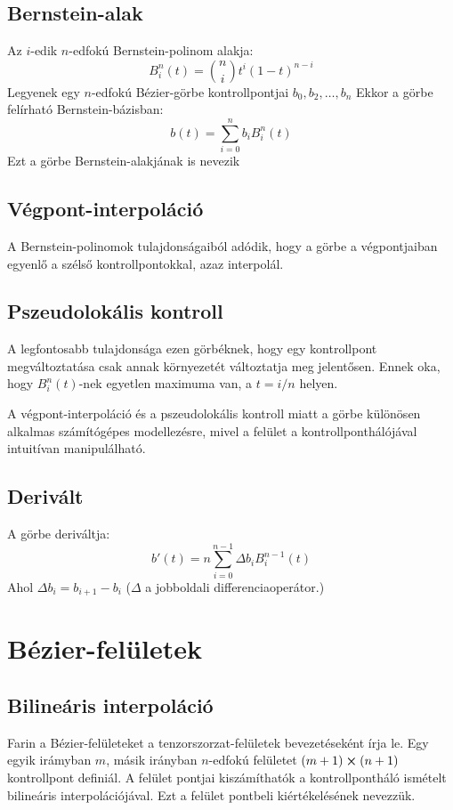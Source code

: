 \subsection{Bernstein-alak}
Az $i$-edik $n$-edfokú Bernstein-polinom alakja:
$$ B^n_i(t) = \binom{n}{i}t^i(1-t)^{n-i} $$
Legyenek egy $n$-edfokú Bézier-görbe kontrollpontjai $b_0,b_2,\dots,b_n$ Ekkor a görbe felírható Bernstein-bázisban:
$$ b(t) = \sum_{i=0}^n b_i B^n_i(t) $$
Ezt a görbe Bernstein-alakjának is nevezik

\subsection{Végpont-interpoláció}
A Bernstein-polinomok tulajdonságaiból adódik, hogy a görbe a végpontjaiban egyenlő a szélső kontrollpontokkal, azaz interpolál.

\subsection{Pszeudolokális kontroll}
A legfontosabb tulajdonsága ezen görbéknek, hogy egy kontrollpont megváltoztatása csak annak környezetét változtatja meg jelentősen. Ennek oka, hogy $B^n_i(t)$-nek egyetlen maximuma van, a $t = i/n$ helyen. \cite[62. o.]{farin2002curves}

A végpont-interpoláció és a pszeudolokális kontroll miatt a görbe különösen alkalmas számítógépes modellezésre, mivel a felület a kontrollponthálójával intuitívan manipulálható.

\subsection{Derivált}
A görbe deriváltja: \cite[63. o.]{farin2002curves}
$$ b'(t) = n\sum_{i=0}^{n-1} \Delta b_i B^{n-1}_i(t) $$
Ahol $\Delta b_i = b_{i+1} - b_i$ ($\Delta$ a jobboldali differenciaoperátor.)



\section{Bézier-felületek}

\subsection{Bilineáris interpoláció}
Farin a Bézier-felületeket a tenzorszorzat-felületek bevezetéseként írja le. Egy egyik irámyban $m$, másik irányban $n$-edfokú felületet $(m+1)\cross(n+1)$ kontrollpont definiál. A felület pontjai kiszámíthatók a kontrollpontháló ismételt bilineáris interpolációjával. Ezt a felület pontbeli kiértékelésének nevezzük.

